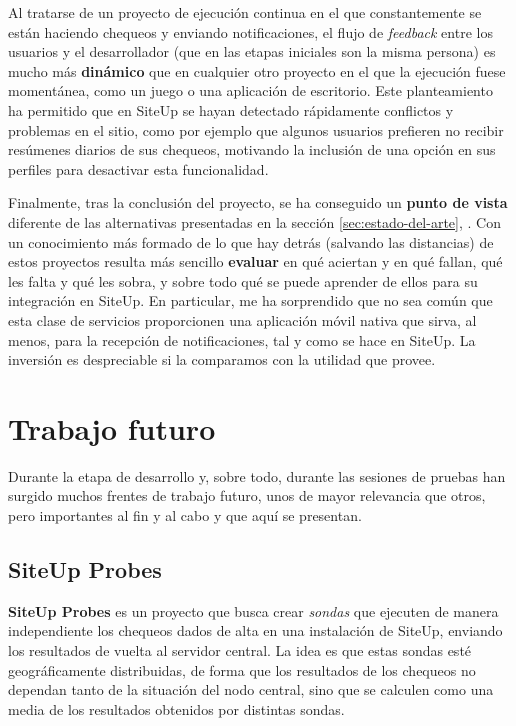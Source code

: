 Al tratarse de un proyecto de ejecución continua en el que constantemente se
están haciendo chequeos y enviando notificaciones, el flujo de \textit{feedback}
entre los usuarios y el desarrollador (que en las etapas iniciales son la misma
persona) es mucho más \textbf{dinámico} que en cualquier otro proyecto en el que
la ejecución fuese momentánea, como un juego o una aplicación de
escritorio. Este planteamiento ha permitido que en SiteUp se hayan detectado
rápidamente conflictos y problemas en el sitio, como por ejemplo que algunos
usuarios prefieren no recibir resúmenes diarios de sus chequeos, motivando la
inclusión de una opción en sus perfiles para desactivar esta funcionalidad.

Finalmente, tras la conclusión del proyecto, se ha conseguido un \textbf{punto
  de vista} diferente de las alternativas presentadas en la sección
\ref{sec:estado-del-arte}, \textit{}. Con un
conocimiento más formado de lo que hay detrás (salvando las distancias) de estos
proyectos resulta más sencillo \textbf{evaluar} en qué aciertan y en qué fallan,
qué les falta y qué les sobra, y sobre todo qué se puede aprender de ellos para
su integración en SiteUp. En particular, me ha sorprendido que no sea común que
esta clase de servicios proporcionen una aplicación móvil nativa que sirva, al
menos, para la recepción de notificaciones, tal y como se hace en SiteUp. La
inversión es despreciable si la comparamos con la utilidad que provee.


\section{Trabajo futuro}

Durante la etapa de desarrollo y, sobre todo, durante las sesiones de pruebas
han surgido muchos frentes de trabajo futuro, unos de mayor relevancia que
otros, pero importantes al fin y al cabo y que aquí se presentan.

\subsection{SiteUp Probes}

\textbf{SiteUp Probes} es un proyecto que busca crear \textit{sondas} que
ejecuten de manera independiente los chequeos dados de alta en una instalación
de SiteUp, enviando los resultados de vuelta al servidor central. La idea es que
estas sondas esté geográficamente distribuidas, de forma que los resultados de
los chequeos no dependan tanto de la situación del nodo central, sino que se
calculen como una media de los resultados obtenidos por distintas sondas.

